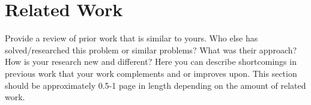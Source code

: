 
\section{Related Work}

Provide a review of prior work that is similar to yours. Who else has
solved/researched this problem or similar problems? What was their approach?
How is your research new and different? Here you can describe shortcomings in
previous work that your work complements and or improves upon. This section
should be approximately 0.5-1 page in length depending on the amount of related
work.